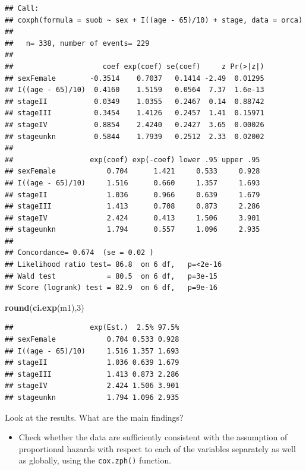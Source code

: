 \documentclass[
]{book}
\newenvironment{Shaded}{\begin{snugshade}}{\end{snugshade}}
\newcommand{\DecValTok}[1]{\textcolor[rgb]{0.00,0.00,0.81}{#1}}
\newcommand{\FunctionTok}[1]{\textcolor[rgb]{0.13,0.29,0.53}{\textbf{#1}}}
\newcommand{\NormalTok}[1]{#1}
\providecommand{\tightlist}{%
  \setlength{\itemsep}{0pt}\setlength{\parskip}{0pt}}
\begin{document}
\begin{verbatim}
## Call:
## coxph(formula = suob ~ sex + I((age - 65)/10) + stage, data = orca)
## 
##   n= 338, number of events= 229 
## 
##                     coef exp(coef) se(coef)     z Pr(>|z|)
## sexFemale        -0.3514    0.7037   0.1414 -2.49  0.01295
## I((age - 65)/10)  0.4160    1.5159   0.0564  7.37  1.6e-13
## stageII           0.0349    1.0355   0.2467  0.14  0.88742
## stageIII          0.3454    1.4126   0.2457  1.41  0.15971
## stageIV           0.8854    2.4240   0.2427  3.65  0.00026
## stageunkn         0.5844    1.7939   0.2512  2.33  0.02002
## 
##                  exp(coef) exp(-coef) lower .95 upper .95
## sexFemale            0.704      1.421     0.533     0.928
## I((age - 65)/10)     1.516      0.660     1.357     1.693
## stageII              1.036      0.966     0.639     1.679
## stageIII             1.413      0.708     0.873     2.286
## stageIV              2.424      0.413     1.506     3.901
## stageunkn            1.794      0.557     1.096     2.935
## 
## Concordance= 0.674  (se = 0.02 )
## Likelihood ratio test= 86.8  on 6 df,   p=<2e-16
## Wald test            = 80.5  on 6 df,   p=3e-15
## Score (logrank) test = 82.9  on 6 df,   p=9e-16
\end{verbatim}

\begin{Shaded}
\begin{Highlighting}[]
\FunctionTok{round}\NormalTok{(}\FunctionTok{ci.exp}\NormalTok{(m1),}\DecValTok{3}\NormalTok{)}
\end{Highlighting}
\end{Shaded}

\begin{verbatim}
##                  exp(Est.)  2.5% 97.5%
## sexFemale            0.704 0.533 0.928
## I((age - 65)/10)     1.516 1.357 1.693
## stageII              1.036 0.639 1.679
## stageIII             1.413 0.873 2.286
## stageIV              2.424 1.506 3.901
## stageunkn            1.794 1.096 2.935
\end{verbatim}

Look at the results. What are the main findings?

\begin{itemize}
\tightlist
\item
  Check whether the data are sufficiently consistent with the
  assumption of proportional hazards with respect to each of
  the variables separately
  as well as globally, using the \texttt{cox.zph()} function.
\end{itemize}
\end{document}
